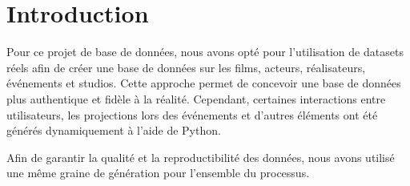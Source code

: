 \section*{Introduction}

Pour ce projet de base de données, nous avons opté pour l'utilisation de datasets réels afin de créer une base de données sur les films, acteurs, réalisateurs, événements et studios. Cette approche permet de concevoir une base de données plus authentique et fidèle à la réalité. Cependant, certaines interactions entre utilisateurs, les projections lors des événements et d'autres éléments ont été générés dynamiquement à l'aide de Python.

Afin de garantir la qualité et la reproductibilité des données, nous avons utilisé une même graine de génération pour l'ensemble du processus.